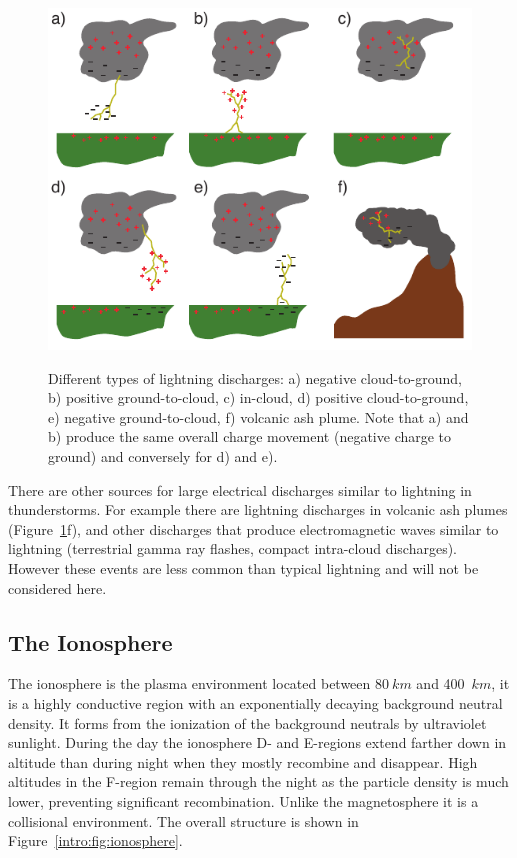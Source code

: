 \begin{figure}[ht!]
	\centering
	\includegraphics[scale=1]{Introduction/Figures/Lightning_Types.pdf}\\
	\caption{Different types of lightning discharges:
			a) negative cloud-to-ground,
			b) positive ground-to-cloud,
			c) in-cloud,
			d) positive cloud-to-ground,
			e) negative ground-to-cloud,
			f) volcanic ash plume.
			Note that a) and b) produce the same overall charge movement (negative charge to ground) and conversely for d) and e).}
	\label{intro:fig:types}
\end{figure}

There are other sources for large electrical discharges similar to lightning in thunderstorms.
For example there are lightning discharges in volcanic ash plumes (Figure~\ref{intro:fig:types}f), and other discharges that produce electromagnetic waves similar to lightning (terrestrial gamma ray flashes, compact intra-cloud discharges).
However these events are less common than typical lightning and will not be considered here.

\subsection{The Ionosphere}

The ionosphere is the plasma environment located between $80~km$ and 400~$km$, it is a highly conductive region with an exponentially decaying background neutral density.
It forms from the ionization of the background neutrals by ultraviolet sunlight.
During the day the ionosphere D- and E-regions extend farther down in altitude than during night when they mostly recombine and disappear.
High altitudes in the F-region remain through the night as the particle density is much lower, preventing significant recombination.
Unlike the magnetosphere it is a collisional environment.
The overall structure is shown in Figure~\ref{intro:fig:ionosphere}.

